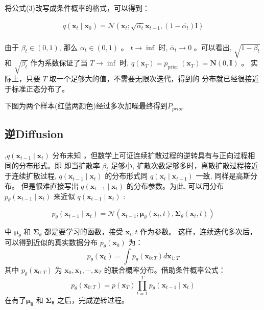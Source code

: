 \documentclass[]{ctexart}
\begin{document}
将公式(3)改写成条件概率的格式，可以得到：

$$
\begin{gathered}
q\left(\mathbf{x}_t \mid \mathbf{x}_{0}\right)=\mathcal{N}\left(\mathbf{x}_t ; \sqrt{\bar{\alpha_t}} \mathbf{x}_{t-1}, (1-\bar{\alpha_t}) \mathrm{I}\right) \\
\end{gathered}
$$

由于 $\beta_t \in(0,1)$, 那么 $\alpha_t \in(0,1)$ 。 $t \rightarrow \inf$ 时, $\bar{\alpha}_t \rightarrow 0$ 。可以看出, $\sqrt{1-\beta_t}$ 和 $\sqrt{\beta_t}$ 
作为系数保证了当 $T \rightarrow \inf$ 时, $q\left(\mathbf{x}_T\right)=p_{\text {prior }}\left(\mathbf{x}_T\right)=\mathbf{N}(0, \mathbf{I})$ 。
实际上，只要 $T$ 取一个足够大的值，不需要无限次迭代，得到的 分布就已经很接近于标准正态分布了。

下图为两个样本(红蓝两颜色)经过多次加噪最终得到$P_{prior}$

\subsection{逆Diffusion}
,$q\left(\mathbf{x}_{t-1} \mid \mathbf{x}_t\right)$ 分布未知
，但数学上可证连续扩散过程的逆转具有与正向过程相同的分布形式。即
即当扩散率 $\beta_t$ 足够小, 扩散次数足够多时，离散扩散过程接近于连续扩散过程, 
$q\left(\mathbf{x}_{t-1} \mid \mathbf{x}_t\right)$ 的分布形式同 $q\left(\mathbf{x}_t \mid \mathbf{x}_{t-1}\right)$ 一致, 同样是高斯分布。
    但是很难直接写出 $q\left(\mathbf{x}_{t-1} \mid \mathbf{x}_t\right)$ 的分布参数。为此, 可以用分布 $p_\theta\left(\mathbf{x}_{t-1} \mid \mathbf{x}_t\right)$ 来近似 $q\left(\mathbf{x}_{t-1} \mid \mathbf{x}_t\right)$ :

$$
p_\theta\left(\mathbf{x}_{t-1} \mid \mathbf{x}_t\right)=\mathcal{N}\left(\mathbf{x}_{t-1} ; \boldsymbol{\mu}_\theta\left(\mathbf{x}_t, t\right), \mathbf{\Sigma}_\theta\left(\mathbf{x}_t, t\right)\right)
$$

中 $\boldsymbol{\mu}_\theta$ 和 $\boldsymbol{\Sigma}_\theta$ 都是要学习的函数，接受 $\mathbf{x}_t, t$ 作为参数。
这样，连续迭代多次后，可以得到近似的真实数据分布 $p_\theta\left(\mathbf{x}_0\right)$ 为：
$$
p_\theta\left(\mathbf{x}_0\right)=\int p_\theta\left(\mathbf{x}_{0: T}\right) d \mathbf{x}_{1: T}
$$
其中 $p_\theta\left(\mathbf{x}_{0: T}\right)$ 为 $\mathbf{x}_0, \mathbf{x}_1, \cdots, \mathbf{x}_T$ 的联合概率分布。借助条件概率公式：
$$
p_\theta\left(\mathbf{x}_{0: T}\right)=p\left(\mathbf{x}_T\right) \prod_{t=1}^T p_\theta\left(\mathbf{x}_{t-1} \mid \mathbf{x}_t\right)
$$
在有了$\mathbf{\mu_{\theta}}$ 和 $\mathbf{\Sigma_{\theta}}$ 之后，完成逆转过程。
\end{document}
